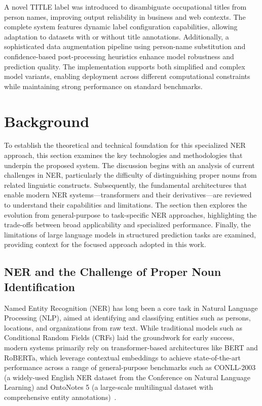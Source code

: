 \documentclass[a4paper]{usiinfbachelorproject}
\begin{document}
A novel TITLE label was introduced to disambiguate occupational titles from person names, improving output reliability in business and web contexts. The complete system features dynamic label configuration capabilities, allowing adaptation to datasets with or without title annotations. Additionally, a sophisticated data augmentation pipeline using person-name substitution and confidence-based post-processing heuristics enhance model robustness and prediction quality. The implementation supports both simplified and complex model variants, enabling deployment across different computational constraints while maintaining strong performance on standard benchmarks.




\section{\textbf{Background}}

To establish the theoretical and technical foundation for this specialized NER approach, this section examines the key technologies and methodologies that underpin the proposed system. The discussion begins with an analysis of current challenges in NER, particularly the difficulty of distinguishing proper nouns from related linguistic constructs. Subsequently, the fundamental architectures that enable modern NER systems—transformers and their derivatives—are reviewed to understand their capabilities and limitations. The section then explores the evolution from general-purpose to task-specific NER approaches, highlighting the trade-offs between broad applicability and specialized performance. Finally, the limitations of large language models in structured prediction tasks are examined, providing context for the focused approach adopted in this work.

\subsection{NER and the Challenge of Proper Noun Identification}

Named Entity Recognition (NER) has long been a core task in Natural Language Processing (NLP), aimed at identifying and classifying entities such as persons, locations, and organizations from raw text. While traditional models such as Conditional Random Fields (CRFs) laid the groundwork for early success, modern systems primarily rely on transformer-based architectures like BERT and RoBERTa, which leverage contextual embeddings to achieve state-of-the-art performance across a range of general-purpose benchmarks such as CONLL-2003 (a widely-used English NER dataset from the Conference on Natural Language Learning) and OntoNotes 5 (a large-scale multilingual dataset with comprehensive entity annotations)~\cite{inbook}.
\end{document}
